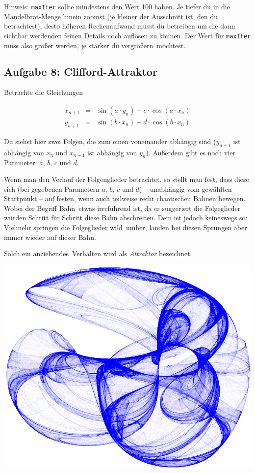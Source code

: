Hinweis: \lstinline|maxIter| sollte mindestens den Wert 100 haben. Je tiefer du
in die Mandelbrot-Menge hinein zoomst (je kleiner der Ausschnitt ist, den du
betrachtest), desto höheren Rechenaufwand musst du betreiben um die dann
sichtbar werdenden feinen Details noch auflösen zu können. Der Wert für
\lstinline|maxIter| muss also größer werden, je stärker du \glqq
vergrößern\grqq\ möchtest.


\subsection{Aufgabe 8: Clifford-Attraktor}

Betrachte die Gleichungen

\begin{eqnarray}
x_{n+1} &=& \sin (a \cdot y_n) + c \cdot \cos (a \cdot x_n)
\label{eq:clifford1}\\
y_{n+1} &=& \sin (b \cdot x_n) + d \cdot \cos (b \cdot x_n)
\label{eq:clifford2}
\end{eqnarray}

Du siehst hier zwei Folgen, die zum einen voneinander abhängig sind ($y_{n+1}$
ist abhängig von $x_n$ und $x_{n+1}$ ist abhängig von $y_n$). Außerdem gibt es
noch vier Parameter: $a$, $b$, $c$ und $d$.

Wenn man den Verlauf der Folgenglieder betrachtet, so stellt man fest, dass
diese sich (bei gegebenen Parametern $a$, $b$, $c$ und $d$) -- unabhängig vom
gewählten Startpunkt -- auf festen, wenn auch teilweise recht chaotischen Bahnen
bewegen. Wobei der Begriff \glqq Bahn\grqq\ etwas irreführend ist, da er
suggeriert die Folgeglieder würden Schritt für Schritt diese Bahn abschreiten.
Dem ist jedoch keineswegs so: Vielmehr springen die Folgeglieder \glqq
wild\grqq\ umher, landen bei diesen Sprüngen aber immer wieder auf dieser \glqq
Bahn\grqq .

Solch ein \glqq anziehendes\grqq\ Verhalten wird als \emph{Attraktor}
bezeichnet.

\begin{center}
\includegraphics[width=1.0\textwidth]{./inf/SEKII/18_Java_Arrays/clifford.png}
\end{center}

